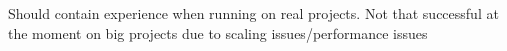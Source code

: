Should contain experience when running on real projects.
Not that successful at the moment on big projects due to scaling issues/performance issues
